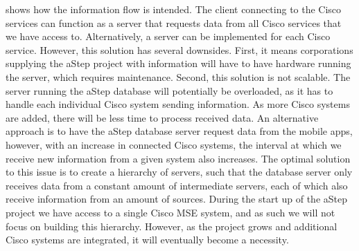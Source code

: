  shows how the information flow is intended. The client connecting to the Cisco services can function as a server that requests data from all Cisco services that we have access to. Alternatively, a server can be implemented for each Cisco service. However, this solution has several downsides. First, it means corporations supplying the aStep project with information will have to have hardware running the server, which requires maintenance. Second, this solution is not scalable. The server running the aStep database will potentially be overloaded, as it has to handle each individual Cisco system sending information. As more Cisco systems are added, there will be less time to process received data. An alternative approach is to have the aStep database server request data from the mobile apps, however, with an increase in connected Cisco systems, the interval at which we receive new information from a given system also increases. The optimal solution to this issue is to create a hierarchy of servers, such that the database server only receives data from a constant amount of intermediate servers, each of which also receive information from an amount of sources. During the start up of the aStep project we have access to a single Cisco MSE system, and as such we will not focus on building this hierarchy. However, as the project grows and additional Cisco systems are integrated, it will eventually become a necessity.  